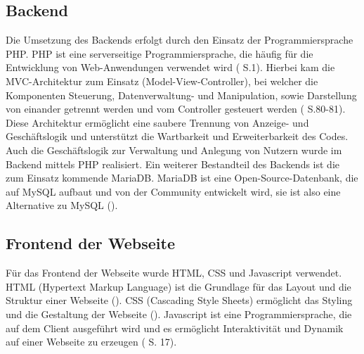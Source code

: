 \documentclass[fontsize:11pt]{article}
\begin{document}
    \subsection{Backend}
        Die Umsetzung des Backends erfolgt durch den Einsatz der Programmiersprache PHP. PHP ist eine serverseitige Programmiersprache, die häufig für die Entwicklung von Web-Anwendungen verwendet wird (\cite{steve_prettyman_learn_2020} S.1). Hierbei kam die MVC-Architektur zum Einsatz (Model-View-Controller), bei welcher die Komponenten Steuerung, Datenverwaltung- und Manipulation, sowie Darstellung von einander getrennt werden und vom Controller gesteuert werden (\cite{steve_prettyman_learn_2020} S.80-81). Diese Architektur ermöglicht eine saubere Trennung von Anzeige- und Geschäftslogik und unterstützt die Wartbarkeit und Erweiterbarkeit des Codes.
        Auch die Geschäftslogik zur Verwaltung und Anlegung von Nutzern wurde im Backend mittels PHP realisiert. Ein weiterer Bestandteil des Backends ist die zum Einsatz kommende MariaDB. MariaDB ist eine Open-Source-Datenbank, die auf MySQL aufbaut und von der Community entwickelt wird, sie ist also eine Alternative zu MySQL (\cite{noauthor_mariadb_nodate}).
    \subsection{Frontend der Webseite}
        Für das Frontend der Webseite wurde HTML, CSS und Javascript verwendet. HTML (Hypertext Markup Language) ist die Grundlage für das Layout und die Struktur einer Webseite (\cite{noauthor_html_nodate}). CSS (Cascading Style Sheets) ermöglicht das Styling und die Gestaltung der Webseite (\cite{noauthor_cascading_nodate}). Javascript ist eine Programmiersprache, die auf dem Client ausgeführt wird und es ermöglicht Interaktivität und Dynamik auf einer Webseite zu erzeugen (\cite{haverbeke} S. 17).
\end{document}
